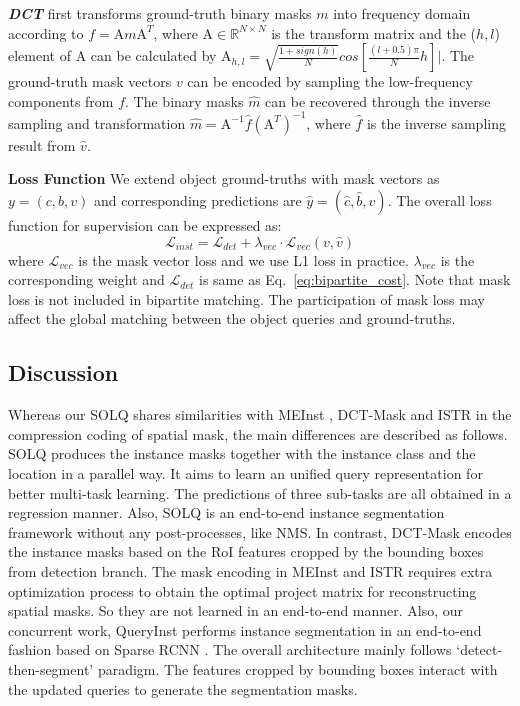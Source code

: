 \documentclass{article}
\begin{document}
\textbf{\textit{DCT}} first transforms ground-truth binary masks $m$ into frequency domain according to $f=\mathrm{A}m\mathrm{A}^{T}$, where $\mathrm{A} \in \mathbb{R}^{N \times N}$ is the transform matrix and the ($h,l$) element of $\mathrm{A}$ can be calculated by $\mathrm{A}_{h,l}=\sqrt{\frac{1+sign(h)}{N}}cos[\frac{(l+0.5)\pi}{N}h]|$. 
The ground-truth mask vectors $v$ can be encoded by sampling the low-frequency components from $f$. The binary masks $\hat{m}$ can be recovered through the inverse sampling and transformation $\hat{m}=\mathrm{A}^{-1}\hat{f}(\mathrm{A}^{T})^{-1}$, where $\hat{f}$ is the inverse sampling result from $\hat{v}$.

\textbf{Loss Function}
We extend object ground-truths with mask vectors as $y=(c,b,v)$ and corresponding predictions are $\hat{y}=(\hat{c}, \hat{b},\hat{v})$. The overall loss function for supervision can be expressed as:
\begin{equation}
\label{eq:bipartite_loss}
\mathcal{L}_{inst} = \mathcal{L}_{det} + \lambda_{vec} \cdot \mathcal{L}_{vec}(v,\hat{v})
\end{equation}
where $\mathcal{L}_{vec}$ is the mask vector loss and we use L1 loss in practice. $\lambda_{vec}$ is the corresponding weight and $\mathcal{L}_{det}$ is same as Eq.~\ref{eq:bipartite_cost}. Note that mask loss is not included in bipartite matching. The participation of mask loss may affect the global matching between the object queries and ground-truths.



\subsection{Discussion}
Whereas our SOLQ shares similarities with MEInst \cite{zhang2020meinst}, DCT-Mask \cite{shen2020dct} and ISTR \cite{hu2021istr} in the compression coding of spatial mask, the main differences are described as follows. SOLQ produces the instance masks together with the instance class and the location in a parallel way. It aims to learn an unified query representation for better multi-task learning. The predictions of three sub-tasks are all obtained in a regression manner. Also, SOLQ is an end-to-end instance segmentation framework without any post-processes, like NMS. In contrast, DCT-Mask encodes the instance masks based on the RoI features cropped by the bounding boxes from detection branch. The mask encoding in MEInst and ISTR requires extra optimization process to obtain the optimal project matrix for reconstructing spatial masks. So they are not learned in an end-to-end manner. Also, our concurrent work, QueryInst \cite{queryinst2021} performs instance segmentation in an end-to-end fashion based on Sparse RCNN \cite{sun2021sparsercnn}. The overall architecture mainly follows `detect-then-segment' paradigm. The features cropped by bounding boxes interact with the updated queries to generate the segmentation masks.
\end{document}
